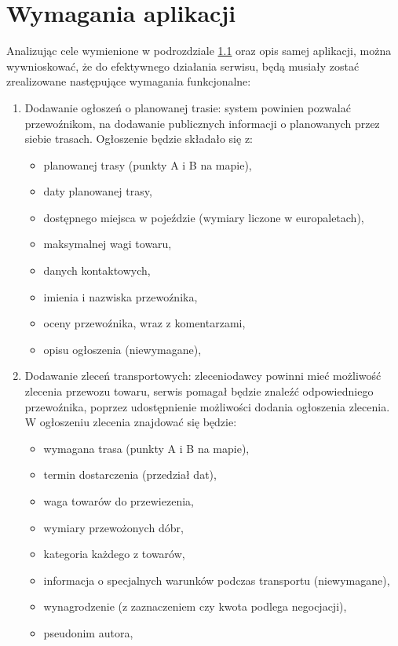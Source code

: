 \section{Wymagania aplikacji}
Analizując cele wymienione w podrozdziale \hyperref[sec:cele]{1.1} oraz opis samej aplikacji, można wywnioskować, że do efektywnego działania serwisu, będą musiały zostać zrealizowane następujące wymagania funkcjonalne:
\begin{enumerate}
    \item Dodawanie ogłoszeń o planowanej trasie: system powinien pozwalać przewoźnikom, na dodawanie publicznych informacji o planowanych przez siebie trasach. Ogłoszenie będzie składało się z:
    \begin{itemize}
        \item planowanej trasy (punkty A i B na mapie),
        \item daty planowanej trasy,
        \item dostępnego miejsca w pojeździe (wymiary liczone w europaletach),
        \item maksymalnej wagi towaru,
        \item danych kontaktowych,
        \item imienia i nazwiska przewoźnika,
        \item oceny przewoźnika, wraz z komentarzami,
        \item opisu ogłoszenia (niewymagane),
    \end{itemize}
    \item Dodawanie zleceń transportowych: zleceniodawcy powinni mieć możliwość zlecenia przewozu towaru, serwis pomagał będzie znaleźć odpowiedniego przewoźnika, poprzez udostępnienie możliwości dodania ogłoszenia zlecenia. W ogłoszeniu zlecenia znajdować się będzie:
    \begin{itemize}
        \item wymagana trasa (punkty A i B na mapie),
        \item termin dostarczenia (przedział dat),
        \item waga towarów do przewiezenia,
        \item wymiary przewożonych dóbr,
        \item kategoria każdego z towarów,
        \item informacja o specjalnych warunków podczas transportu (niewymagane),
        \item wynagrodzenie (z zaznaczeniem czy kwota podlega negocjacji),
        \item pseudonim autora,

\end{itemize}
\end{enumerate}
